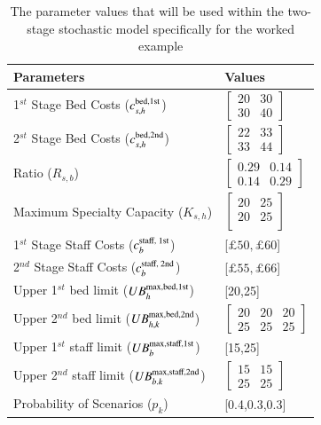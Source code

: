 \documentclass[../thesis.tex]{subfiles}
\begin{document}
\begin{table}[h!]
    \centering
    \begin{tabular}{ll}\toprule
       \textbf{Parameters}  & \textbf{Values} \\\midrule
        1$^{st}$ Stage Bed Costs ($c^\textnormal{bed,1st}_{s,h}$) & $\begin{bmatrix} 20 & 30 \\ 30 & 40 \end{bmatrix}$\\  [0.5cm]
        2$^{st}$ Stage Bed Costs ($c^\textnormal{bed,2nd}_{s,h}$) & $\begin{bmatrix} 22 & 33 \\ 33 & 44 \end{bmatrix}$\\ [0.5cm]
        Ratio ($R_{s,b}$) &$\begin{bmatrix}0.29&0.14\\
         0.14&0.29\end{bmatrix}$\\ [0.5cm]
         Maximum Specialty Capacity ($K_{s,h}$) &$\begin{bmatrix}
         20 &25  \\ 20 & 25\\
         \end{bmatrix}$\\[0.5cm]
         1$^{st}$ Stage Staff Costs ($c^\textnormal{staff, 1st}_{b}$) &[$\pounds50, \pounds60$] \\ [0.25cm]
         2$^{nd}$ Stage Staff Costs ($c^\textnormal{staff, 2nd}_{b}$) &[$\pounds55, \pounds66$] \\ [0.25cm]
         Upper 1$^{st}$ bed limit ($UB^\textnormal{max,bed,1st}_{h}$) &  [20,25]\\[0.25cm]
         Upper 2$^{nd}$ bed limit ($UB^\textnormal{max,bed,2nd}_{h,k}$) &  $\begin{bmatrix} 20 & 20 &20\\ 25 & 25 &25 \end{bmatrix}$\\[0.5cm]
         Upper 1$^{st}$ staff limit ($UB^\textnormal{max,staff,1st}_{b}$)& [15,25]\\[0.25cm]
         Upper 2$^{nd}$ staff limit ($UB^\textnormal{max,staff,2nd}_{b.k}$)& $\begin{bmatrix} 15 & 15 \\ 25 & 25 \end{bmatrix}$\\[0.5cm]
         Probability of Scenarios ($p_{k}$) & [0.4,0.3,0.3]\\
         
         \bottomrule
    \end{tabular}
    \caption{The parameter values that will be used within the two-stage stochastic model specifically for the worked example}
    \label{tab:StochaWorkedExample}
\end{table}
\end{document}
